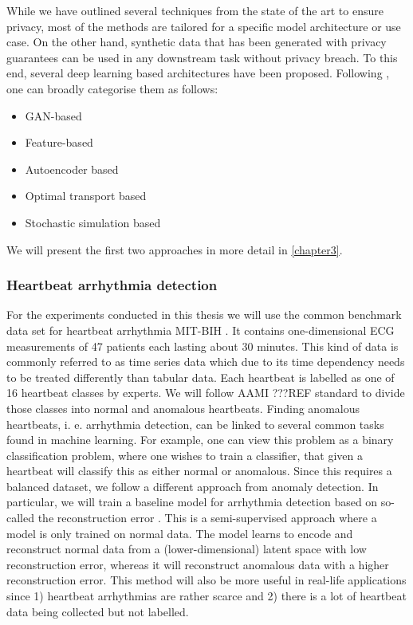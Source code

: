 While we have outlined several techniques from the state of the art to ensure privacy, most of the methods are tailored for a specific model architecture or use case. On the other hand, synthetic data that has been generated with privacy guarantees can be used in any downstream task without privacy breach. To this end, several deep learning based architectures have been proposed. Following \parencite{hu2023sok}, one can broadly categorise them as follows:
\begin{itemize}
    \item GAN-based
    \item Feature-based
    \item Autoencoder based {\tiny \Parencite[see e. g.][for a generator based on a variational autoencoder that is trained with DP-SGD]{vae}}
    \item Optimal transport based {\tiny \Parencite[see e. g.][for generator based on the so-called Sinkhorn divergence]{cao2021dont}}
    \item Stochastic simulation based {\tiny \Parencite[see e. g.][for a differentially-private diffusion model]{dpgen}}
\end{itemize}

We will present the first two approaches in more detail in \cref{chapter3}.

\subsubsection*{Heartbeat arrhythmia detection}
For the experiments conducted in this thesis we will use the common benchmark data set for heartbeat arrhythmia MIT-BIH \parencite{moody2001impact}. It contains one-dimensional ECG measurements of 47 patients each lasting about 30 minutes. This kind of data is commonly referred to as time series data which due to its time dependency needs to be treated differently than tabular data. Each heartbeat is labelled as one of 16 heartbeat classes by experts. We will follow AAMI ???REF standard to divide those classes into normal and anomalous heartbeats. Finding anomalous heartbeats, i. e. arrhythmia detection, can be linked to several common tasks found in machine learning. For example, one can view this problem as a binary classification problem, where one wishes to train a classifier, that given a heartbeat will classify this as either normal or anomalous. Since this requires a balanced dataset, we follow a different approach from anomaly detection. In particular, we will train a baseline model for arrhythmia detection based on so-called the reconstruction error \parencite[see][for an in-depth survey on anomaly detection with times series]{schmidl2022anomaly}. This is a semi-supervised approach where a model is only trained on normal data. The model learns to encode and reconstruct normal data from a (lower-dimensional) latent space with low reconstruction error, whereas it will reconstruct anomalous data with a higher reconstruction error. This method will also be more useful in real-life applications since 1) heartbeat arrhythmias are rather scarce and 2) there is a lot of heartbeat data being collected but not labelled.

